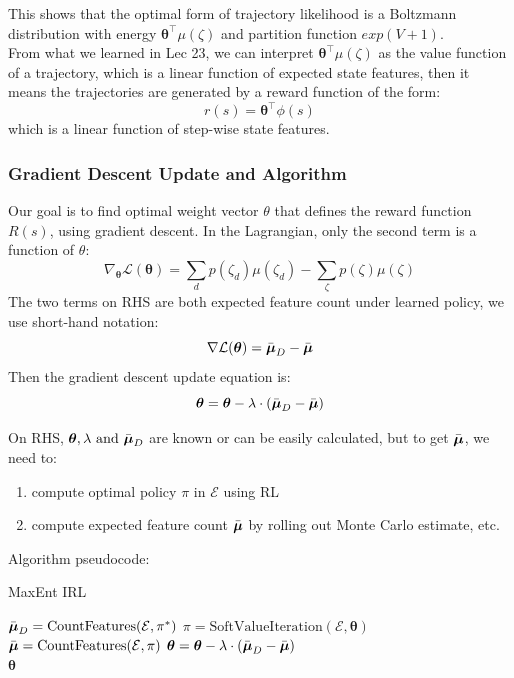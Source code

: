 \documentclass[11pt]{article}
\begin{document}
This shows that the optimal form of trajectory likelihood is a Boltzmann distribution \cite{wiki:boltzmann} with energy $\boldsymbol\theta^\intercal \mu(\zeta)$ and partition function $exp(V+1)$. \\

From what we learned in Lec 23, we can interpret $\boldsymbol\theta^\intercal \mu(\zeta)$ as the value function of a trajectory, which is a linear function of expected state features, then it means the trajectories are generated by a reward function of the form:
\[ r(s) = \boldsymbol\theta^\intercal \phi(s) \] 
which is a linear function of step-wise state features.

\subsubsection{Gradient Descent Update and Algorithm}
Our goal is to find optimal weight vector $\theta$ that defines the reward function $R(s)$, using gradient descent. In the Lagrangian, only the second term is a function of $\theta$:
\[ \nabla_{\boldsymbol\theta} \mathcal{L}(\boldsymbol\theta) = \sum_d p(\zeta_d) \mu(\zeta_d) - \sum_\zeta p(\zeta) \mu(\zeta) \]
The two terms on RHS are both expected feature count under learned policy, we use short-hand notation:
\[ \nabla \mathcal{L}(\boldsymbol\theta) = \Bar{\boldsymbol\mu}_D - \Bar{\boldsymbol\mu} \]
Then the gradient descent update equation is:
\[ \boldsymbol\theta = \boldsymbol\theta - \lambda \cdot (\Bar{\boldsymbol\mu}_D - \Bar{\boldsymbol\mu}) \]

On RHS, $\boldsymbol\theta, \lambda \text{ and } \Bar{\boldsymbol\mu}_D$ are known or can be easily calculated, but to get $\Bar{\boldsymbol\mu}$, we need to:
\begin{enumerate}
    \item compute optimal policy $\pi$ in $\mathcal{E}$ using RL
    \item compute expected feature count $\Bar{\boldsymbol\mu}$ by rolling out Monte Carlo estimate, etc.
\end{enumerate}

Algorithm pseudocode:
\begin{algorithm}
\caption{MaxEnt IRL}
\label{alg:maxent}
\begin{algorithmic}[1]
\State $\Bar{\boldsymbol\mu}_D = \text{CountFeatures} (\mathcal{E}, \pi^*)$
    \State $\pi = \text{SoftValueIteration}(\mathcal{E}, \boldsymbol\theta)$ 
    \State $\Bar{\boldsymbol\mu} = \text{CountFeatures} (\mathcal{E}, \pi)$ 
    \State $\boldsymbol\theta = \boldsymbol\theta - \lambda \cdot (\Bar{\boldsymbol\mu}_D - \Bar{\boldsymbol\mu})$ 
\EndWhile \\
\Return $\boldsymbol\theta$
\EndFunction
\end{algorithmic}
\end{algorithm}
\end{document}
